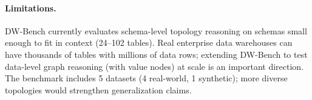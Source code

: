 \paragraph{Limitations.}
DW-Bench currently evaluates schema-level topology reasoning on schemas
small enough to fit in context (24--102 tables). Real enterprise data
warehouses can have thousands of tables with millions of data rows;
extending DW-Bench to test data-level graph reasoning (with value nodes)
at scale is an important direction. The benchmark includes 5 datasets
(4 real-world, 1 synthetic); more diverse topologies would strengthen
generalization claims.
